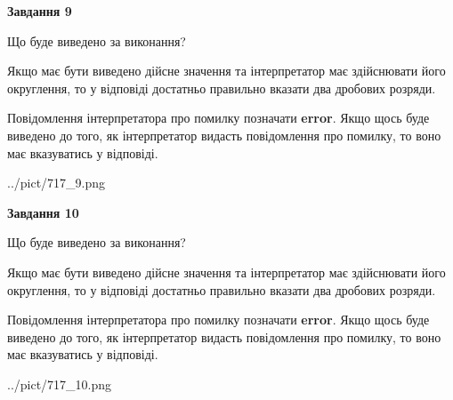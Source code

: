 \documentclass[12pt, ukrainian]{article}
\begin{document}
{\begin {Large}
{\begin {center}\textbf{Завдання 9}\end {center}}\par
Що буде виведено за виконання? \par

Якщо має бути виведено дійсне значення та інтерпретатор має здійснювати його округлення, 
то у відповіді достатньо правильно вказати два дробових розряди.

Повідомлення інтерпретатора про помилку позначати \textbf{error}.
Якщо щось буде виведено до того, як інтерпретатор видасть повідомлення про помилку, 
то воно має вказуватись у відповіді. \par

\begin{center}
	{../pict/717_9.png}
\end{center}
\newpage

{\begin {center}\textbf{Завдання 10}\end {center}}\par
Що буде виведено за виконання? \par

Якщо має бути виведено дійсне значення та інтерпретатор має здійснювати його округлення, 
то у відповіді достатньо правильно вказати два дробових розряди.

Повідомлення інтерпретатора про помилку позначати \textbf{error}.
Якщо щось буде виведено до того, як інтерпретатор видасть повідомлення про помилку, 
то воно має вказуватись у відповіді. \par

\begin{center}
	{../pict/717_10.png}
\end{center}
\newpage

\end {Large}}
\end{document}
